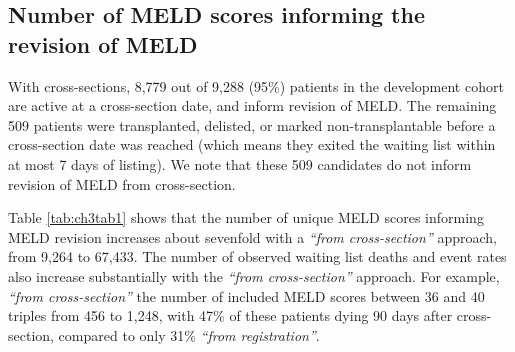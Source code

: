 \documentclass[11pt,twoside,]{book}
\begin{document}
\FloatBarrier

\subsection{Number of MELD scores informing the revision of MELD}\label{number-of-meld-scores-informing-the-revision-of-meld}

With cross-sections, 8,779 out of 9,288 (95\%) patients in the
development cohort are active at a cross-section date, and inform
revision of MELD. The remaining 509 patients
were transplanted, delisted, or marked non-transplantable before a cross-section date
was reached (which means they exited the waiting list within at most 7 days of listing). We note that these 509 candidates do not inform revision of
MELD from cross-section.

Table \ref{tab:ch3tab1} shows that the number of unique MELD scores
informing MELD revision increases about sevenfold with a \emph{``from
cross-section''} approach, from 9,264 to 67,433.
The number of observed waiting list deaths and event rates also increase
substantially with the \emph{``from cross-section''} approach. For example, \emph{``from
cross-section''} the number of included MELD scores between 36 and 40
triples from 456 to 1,248, with 47\% of these patients dying 90 days
after cross-section, compared to only 31\% \emph{``from registration''}.

\begingroup
\setlength{\aboverulesep}{0.2ex}
\setlength{\belowrulesep}{0.3ex}
\end{document}
